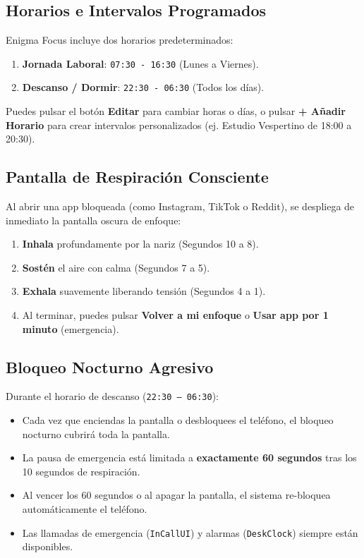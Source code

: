 \documentclass[11pt,a4paper]{article}
\begin{document}
\subsection{Horarios e Intervalos Programados}
Enigma Focus incluye dos horarios predeterminados:
\begin{enumerate}
    \item \textbf{Jornada Laboral}: \texttt{07:30 - 16:30} (Lunes a Viernes).
    \item \textbf{Descanso / Dormir}: \texttt{22:30 - 06:30} (Todos los días).
\end{enumerate}
Puedes pulsar el botón \textbf{Editar} para cambiar horas o días, o pulsar \textbf{+ Añadir Horario} para crear intervalos personalizados (ej. Estudio Vespertino de 18:00 a 20:30).

\subsection{Pantalla de Respiración Consciente}
Al abrir una app bloqueada (como Instagram, TikTok o Reddit), se despliega de inmediato la pantalla oscura de enfoque:
\begin{enumerate}
    \item \textbf{Inhala} profundamente por la nariz (Segundos 10 a 8).
    \item \textbf{Sostén} el aire con calma (Segundos 7 a 5).
    \item \textbf{Exhala} suavemente liberando tensión (Segundos 4 a 1).
    \item Al terminar, puedes pulsar \textbf{Volver a mi enfoque} o \textbf{Usar app por 1 minuto} (emergencia).
\end{enumerate}

\subsection{Bloqueo Nocturno Agresivo}
Durante el horario de descanso (\texttt{22:30 -- 06:30}):
\begin{itemize}
    \item Cada vez que enciendas la pantalla o desbloquees el teléfono, el bloqueo nocturno cubrirá toda la pantalla.
    \item La pausa de emergencia está limitada a \textbf{exactamente 60 segundos} tras los 10 segundos de respiración.
    \item Al vencer los 60 segundos o al apagar la pantalla, el sistema re-bloquea automáticamente el teléfono.
    \item Las llamadas de emergencia (\texttt{InCallUI}) y alarmas (\texttt{DeskClock}) siempre están disponibles.
\end{itemize}
\end{document}
